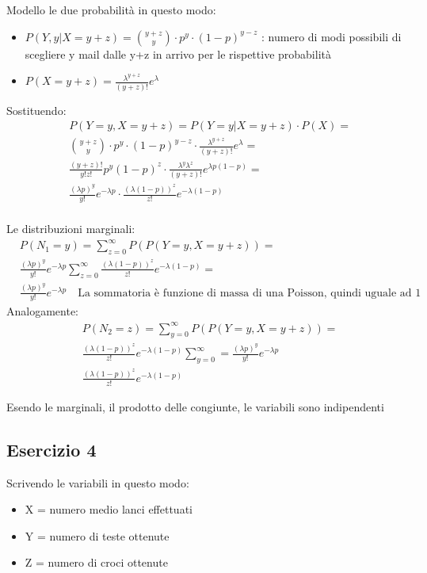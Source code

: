 \documentclass[12pt]{article}
\begin{document}
Modello le due probabilità in questo modo:
\begin{itemize}
    \item \(P(Y,y|X = y+z) = \binom{y+z}{y}\cdot p^y \cdot (1-p)^{y-z} \) : numero di modi possibili di scegliere y mail dalle y+z in arrivo per le rispettive probabilità
    \item \(P(X = y+z) = \frac{\lambda^{y+z}}{(y+z)!} e^{\lambda}\)
\end{itemize}

Sostituendo:
\begin{align*}
    &P(Y=y, X = y+z) = P(Y=y|X = y+z)\cdot P(X) = \\
    &\binom{y+z}{y}\cdot p^y \cdot (1-p)^{y-z} \cdot \frac{\lambda^{y+z}}{(y+z)!} e^{\lambda} = \\
    &\frac{(y+z)!}{y!z!}p^y(1-p)^z \cdot \frac{\lambda^y \lambda^z}{(y+z)!} e^{\lambda p (1-p)} = \\
    &\frac{(\lambda p)^y}{y!}e^{-\lambda p} \cdot \frac{(\lambda (1-p))^z}{z!}e^{-\lambda (1-p)} \\        
\end{align*}

Le distribuzioni marginali:
\begin{align*}
    &P(N_1 = y) = \sum_{z=0}^{\infty} P(P(Y=y, X = y+z)) = \\
    &\frac{(\lambda p)^y}{y!}e^{-\lambda p} \sum_{z=0}^{\infty}\frac{(\lambda (1-p))^z}{z!}e^{-\lambda (1-p)} = \\
    &\frac{(\lambda p)^y}{y!}e^{-\lambda p} \quad \text{La sommatoria è funzione di massa di una Poisson, quindi uguale ad 1}
\end{align*}
Analogamente:
\begin{align*}
    &P(N_2 = z) = \sum_{y=0}^{\infty} P(P(Y=y, X = y+z)) = \\
    &\frac{(\lambda (1-p))^z}{z!}e^{-\lambda (1-p)} \sum_{y=0}^{\infty} = \frac{(\lambda p)^y}{y!}e^{-\lambda p}\\
    &\frac{(\lambda (1-p))^z}{z!}e^{-\lambda (1-p)} 
\end{align*}

Esendo le marginali, il prodotto delle congiunte, le variabili sono indipendenti
\subsection*{Esercizio 4}

Scrivendo le variabili in questo modo:
\begin{itemize}
    \item X = numero medio lanci effettuati 
    \item Y = numero di teste ottenute
    \item Z = numero di croci ottenute 
\end{itemize}
\end{document}
